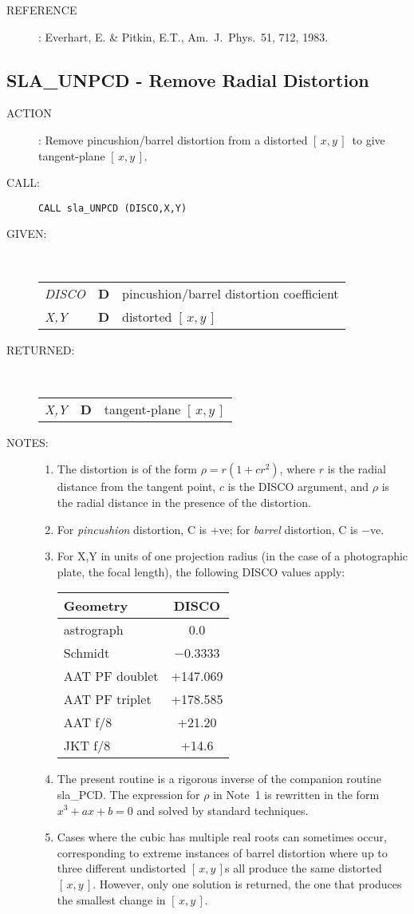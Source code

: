 \documentclass[11pt,twoside]{article}
\newcommand{\xlabel}[1]{}
\newcommand{\xy}        {$[\,x,y\,]$}
\newcommand{\routine}[3]
{\hbadness=10000
  \vbox
  {
    \rule{\textwidth}{0.3mm}\\
    {\Large {\bf #1} \hfill #2 \hfill {\bf #1}}\\
    \setlength{\oldspacing}{\topsep}
    \setlength{\topsep}{0.3ex}
    \begin{description}
      #3
    \end{description}
    \setlength{\topsep}{\oldspacing}
  }
}
\renewcommand{\routine}[3]
   {
      \subsection{#1\xlabel{#1} - #2\label{#1}}
       \begin{description}
         #3
       \end{description}
   }
\newcommand{\action}[1]
{\item[ACTION]: #1}
\newcommand{\action}[1]
   {\item[ACTION:] #1}
\newcommand{\call}[1]
{\item[CALL]: \hspace{0.4em}{\tt #1}}
\newlength{\oldspacing}
\renewcommand{\call}[1]
   {
    \item[CALL:] {\tt #1}
   }
\newcommand{\args}[2]
{
  \goodbreak
  \setlength{\oldspacing}{\topsep}
  \setlength{\topsep}{0.3ex}
  \begin{description}
  \item[#1]:\\[1.5ex]
    \begin{tabular}{p{7em}p{6em}p{22em}}
      #2
    \end{tabular}
  \end{description}
  \setlength{\topsep}{\oldspacing}
}
\renewcommand{\args}[2]
   {
     \begin{description}
        \item[#1:]\\
        \begin{tabular}{p{7em}p{6em}l}
           #2
        \end{tabular}
     \end{description}
   }
\newcommand{\spec}[3]
{
  {\em {#1}} & {\bf \mbox{#2}} & {#3}
}
\newcommand{\notes}[1]
{
  \goodbreak
  \setlength{\oldspacing}{\topsep}
  \setlength{\topsep}{0.3ex}
  \begin{description}
    \item[NOTES]:
        #1
  \end{description}
  \setlength{\topsep}{\oldspacing}
}
\renewcommand{\notes}[1]
   {
      \begin{description}
         \item[NOTES:]
            #1
      \end{description}
   }
\newcommand{\aref}[1]
{
  \goodbreak
  \setlength{\oldspacing}{\topsep}
  \setlength{\topsep}{0.3ex}
  \begin{description}
    \item[REFERENCE]:
        #1
  \end{description}
  \setlength{\topsep}{\oldspacing}
}
\newcommand{\aref}[1]
   {
     \begin{description}
       \item[REFERENCE:]
           #1
     \end{description}
   }
\begin{document}
\aref{Everhart, E. \& Pitkin, E.T., Am.~J.~Phys.~51, 712, 1983.}
\routine{SLA\_UNPCD}{Remove Radial Distortion}
{
 \action{Remove pincushion/barrel distortion from a distorted
         \xy\  to give tangent-plane \xy.}
 \call{CALL sla\_UNPCD (DISCO,X,Y)}
}
\args{GIVEN}
{
 \spec{DISCO}{D}{pincushion/barrel distortion coefficient} \\
 \spec{X,Y}{D}{distorted \xy}
}
\args{RETURNED}
{
 \spec{X,Y}{D}{tangent-plane \xy}
}
\notes
{
 \begin{enumerate}
  \item The distortion is of the form $\rho = r (1 + c r^{2})$, where $r$ is
        the radial distance from the tangent point, $c$ is the DISCO
        argument, and $\rho$ is the radial distance in the presence of
        the distortion.
  \item For {\it pincushion}\/ distortion, C is +ve;  for
        {\it barrel}\/ distortion, C is $-$ve.
  \item For X,Y in units of one projection radius (in the case of
        a photographic plate, the focal length), the following
        DISCO values apply:

        \vspace{2ex}

        \hspace{5em}
        \begin{tabular}{|l|c|} \hline
         Geometry & DISCO \\ \hline \hline
         astrograph & 0.0 \\ \hline
         Schmidt & $-$0.3333 \\ \hline
         AAT PF doublet & +147.069 \\ \hline
         AAT PF triplet & +178.585 \\ \hline
         AAT f/8 & +21.20 \\ \hline
         JKT f/8 & +14.6 \\ \hline
        \end{tabular}

        \vspace{2ex}

  \item The present routine is a rigorous inverse of the companion
        routine sla\_PCD.  The expression for $\rho$ in Note~1
        is rewritten in the form $x^3 + ax + b = 0$ and solved by
        standard techniques.

  \item Cases where the cubic has multiple real roots can sometimes
        occur, corresponding to extreme instances of barrel distortion
        where up to three different undistorted \xy s all produce the
        same distorted \xy.  However, only one solution is returned,
        the one that produces the smallest change in \xy.
 \end{enumerate}
}
\end{document}
